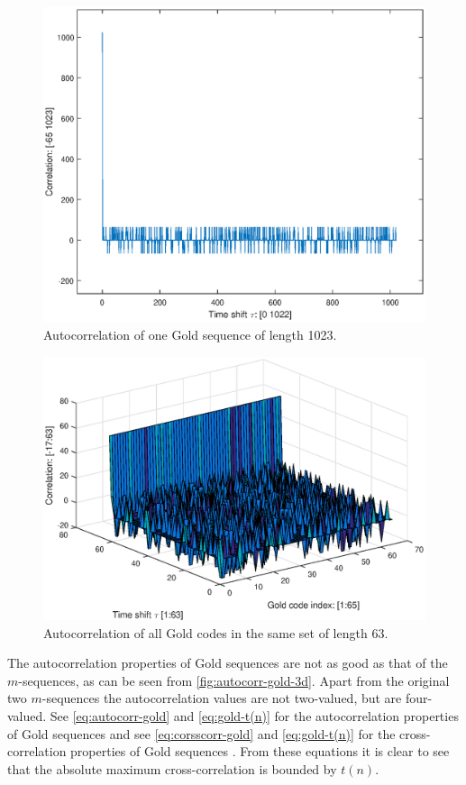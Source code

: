 		\begin{figure}
			\centering
			\includegraphics[width=\textwidth]{chapters/CDMA/autocorr-gold.eps}
			\caption{Autocorrelation of one Gold sequence of length 1023.}
			\label{fig:autocorr-gold}
		\end{figure}


		\begin{figure}
			\centering
			\includegraphics[width=\textwidth]{chapters/CDMA/autocorr-gold-3d.eps}
			\caption{Autocorrelation of all Gold codes in the same set of length 63.}
			\label{fig:autocorr-gold-3d}
		\end{figure}

		The autocorrelation properties of Gold sequences are not as good as that of the $m$-sequences, as can be seen from \autoref{fig:autocorr-gold-3d}.
		Apart from the original two $m$-sequences the autocorrelation values are not two-valued, but are four-valued.
		See \autoref{eq:autocorr-gold} and \autoref{eq:gold-t(n)} for the autocorrelation properties of Gold sequences and see \autoref{eq:corsscorr-gold} and \autoref{eq:gold-t(n)} for the cross-correlation properties of Gold sequences \cite{mitra2008pseudo}.
		From these equations it is clear to see that the absolute maximum cross-correlation is bounded by $t(n)$.

